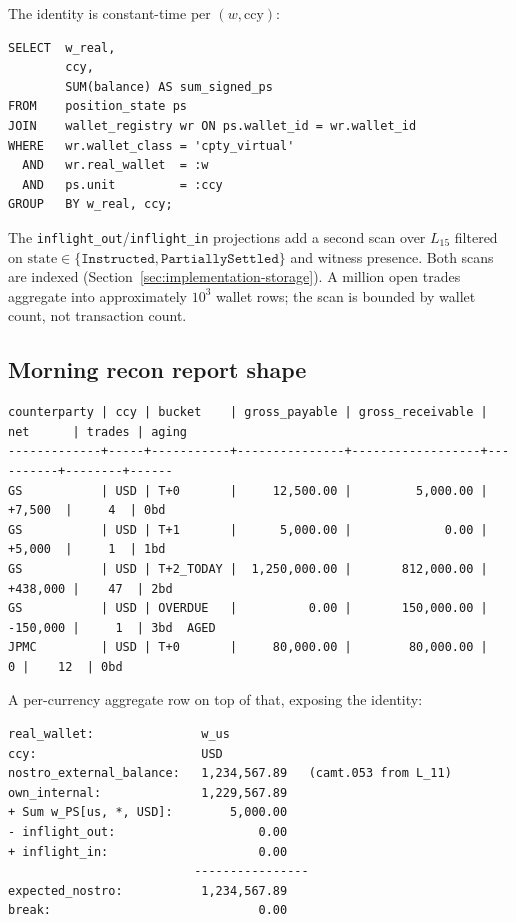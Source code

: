 \documentclass[11pt,a4paper]{article}
\begin{document}
The identity is constant-time per $(w, \mathrm{ccy})$:

\begin{lstlisting}
SELECT  w_real,
        ccy,
        SUM(balance) AS sum_signed_ps
FROM    position_state ps
JOIN    wallet_registry wr ON ps.wallet_id = wr.wallet_id
WHERE   wr.wallet_class = 'cpty_virtual'
  AND   wr.real_wallet  = :w
  AND   ps.unit         = :ccy
GROUP   BY w_real, ccy;
\end{lstlisting}

The \texttt{inflight\_out}/\texttt{inflight\_in} projections add a second scan over $L_{15}$ filtered on $\mathrm{state} \in \{\mathtt{Instructed}, \mathtt{PartiallySettled}\}$ and witness presence. Both scans are indexed (Section~\ref{sec:implementation-storage}). A million open trades aggregate into approximately $10^3$ wallet rows; the scan is bounded by wallet count, not transaction count.

\subsection{Morning recon report shape}
\label{sec:reconciliation-report}

\begin{lstlisting}
counterparty | ccy | bucket    | gross_payable | gross_receivable | net      | trades | aging
-------------+-----+-----------+---------------+------------------+----------+--------+------
GS           | USD | T+0       |     12,500.00 |         5,000.00 |  +7,500  |     4  | 0bd
GS           | USD | T+1       |      5,000.00 |             0.00 |  +5,000  |     1  | 1bd
GS           | USD | T+2_TODAY |  1,250,000.00 |       812,000.00 | +438,000 |    47  | 2bd
GS           | USD | OVERDUE   |          0.00 |       150,000.00 | -150,000 |     1  | 3bd  AGED
JPMC         | USD | T+0       |     80,000.00 |        80,000.00 |        0 |    12  | 0bd
\end{lstlisting}

A per-currency aggregate row on top of that, exposing the identity:

\begin{lstlisting}
real_wallet:               w_us
ccy:                       USD
nostro_external_balance:   1,234,567.89   (camt.053 from L_11)
own_internal:              1,229,567.89
+ Sum w_PS[us, *, USD]:        5,000.00
- inflight_out:                    0.00
+ inflight_in:                     0.00
                          ----------------
expected_nostro:           1,234,567.89
break:                             0.00
\end{lstlisting}
\end{document}

